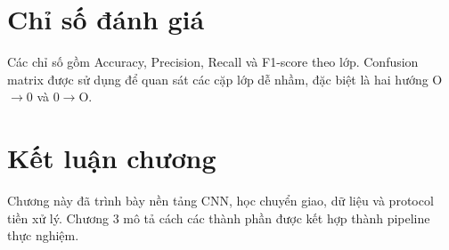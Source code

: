 \section{Chỉ số đánh giá}
Các chỉ số gồm Accuracy, Precision, Recall và F1-score theo lớp. Confusion matrix được sử dụng để quan sát các cặp lớp dễ nhầm, đặc biệt là hai hướng O$\rightarrow$0 và 0$\rightarrow$O.

\section{Kết luận chương}
Chương này đã trình bày nền tảng CNN, học chuyển giao, dữ liệu và protocol tiền xử lý. Chương 3 mô tả cách các thành phần được kết hợp thành pipeline thực nghiệm.

